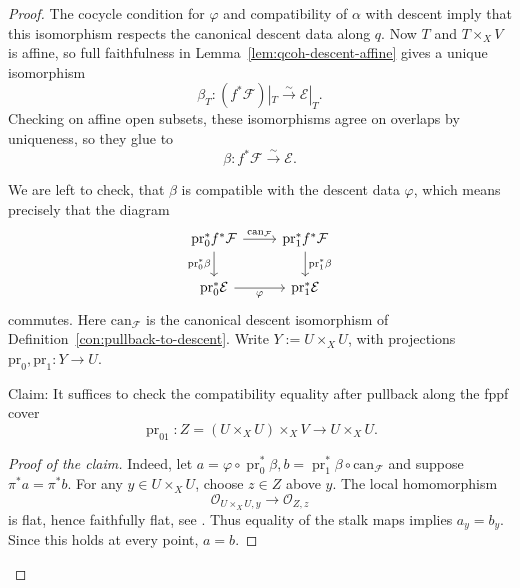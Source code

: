 \begin{proof}
	The cocycle condition for $\varphi$ and compatibility
	of $\alpha$ with descent imply that this isomorphism
	respects the canonical descent data along $q$. Now $T$ and $T\times_X V$ is affine, so full faithfulness in
	Lemma~\ref{lem:qcoh-descent-affine} gives
	a unique isomorphism
	\[
	\beta_T:(f^*\mathcal{F})|_T
	\xrightarrow{\sim}\mathcal{E}|_T.
	\]
	Checking on affine open subsets, these isomorphisms agree on overlaps by uniqueness, so they glue to
	\[
	\beta:f^*\mathcal{F}\xrightarrow{\sim}\mathcal{E}.
	\]

	
	
	
	We are left to check, that $\beta$ is compatible with the descent data $\varphi$, which means precisely that the diagram
	\[\begin{tikzcd}
		{\mathrm{pr}_0^*f^*\mathcal{F}} & {\mathrm{pr}_1^*f^*\mathcal{F}} \\
		{	\mathrm{pr}_0^*\mathcal{E}} & {\mathrm{pr}_1^*\mathcal{E}}
		\arrow["{\mathrm{can}_{\mathcal{F}}}", from=1-1, to=1-2]
		\arrow["{\mathrm{pr}_0^*\beta}"', from=1-1, to=2-1]
		\arrow["{\mathrm{pr}_1^*\beta}", from=1-2, to=2-2]
		\arrow["\varphi"', from=2-1, to=2-2]
	\end{tikzcd}\]
	commutes. Here $\mathrm{can}_{\mathcal{F}}$ is the canonical descent isomorphism of Definition~\ref{con:pullback-to-descent}. Write $Y:= U\times_X U$, with projections $\mathrm{pr}_0,\mathrm{pr}_1:Y\to U$.
	

	Claim:
	It suffices to check the compatibility equality after
	pullback along the fppf cover
	\[
	\operatorname{pr}_{01}:Z=(U\times_X U)\times_X V\longrightarrow U\times_X U.
	\]
	\begin{proof}[Proof of the claim]
		Indeed, let $a = \varphi\circ \operatorname{pr}_0^*\beta, b = \operatorname{pr}_1^*\beta \circ \mathrm{can}_\mathcal{F}$
		and suppose $\pi^*a=\pi^*b$.
		For any $y\in U\times_X U$, choose $z\in Z$ above $y$.
		The local homomorphism
		\[
		\mathcal{O}_{U\times_X U,y}\longrightarrow\mathcal{O}_{Z,z}
		\]
		is flat, hence faithfully flat, see
		\cite[][Tag 00HR]{stacks-project}.
		Thus equality of the stalk maps implies
		$a_y=b_y$.
		Since this holds at every point, $a=b$.
	\end{proof}
	

\end{proof}
